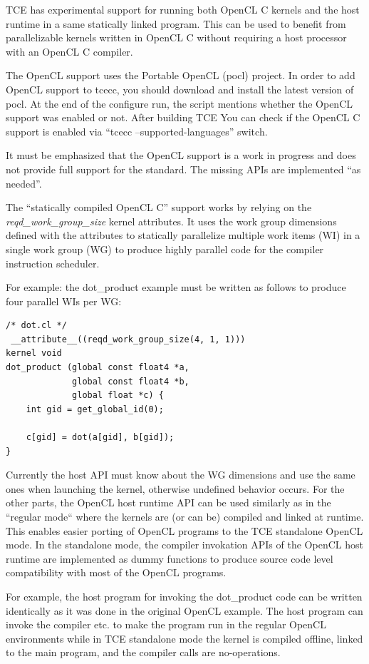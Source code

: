 \documentclass[twoside]{tceusermanual}
\begin{document}
TCE has experimental support for running both OpenCL C kernels and the host 
runtime in a same statically linked program. This can be used to benefit from
parallelizable kernels written in OpenCL C without requiring a host processor 
with an OpenCL C compiler.

The OpenCL support uses the {Portable OpenCL (pocl)} project. In order to
add OpenCL support to tcecc, you should download and install the latest version of 
pocl. At the end of the configure run, the script 
mentions whether the OpenCL support was enabled or not. After building TCE
You can check if the OpenCL C support is enabled via ``tcecc --supported-languages''
switch.

It must be emphasized that the OpenCL support is a work in progress and
does not provide full support for the standard. The missing APIs are
implemented ``as needed''.

The ``statically compiled OpenCL C'' support works by relying on the
\textit{reqd\_work\_group\_size} kernel attributes. It uses the work
group dimensions defined with the attributes to statically parallelize 
multiple work items (WI) in a single work group (WG) to produce highly 
parallel code for the compiler instruction scheduler.

For example: the dot\_product example must be written as follows to
produce four parallel WIs per WG:

\begin{verbatim}
/* dot.cl */
 __attribute__((reqd_work_group_size(4, 1, 1)))
kernel void
dot_product (global const float4 *a,
             global const float4 *b, 
             global float *c) {
    int gid = get_global_id(0);

    c[gid] = dot(a[gid], b[gid]);    
} 
\end{verbatim}

Currently the host API must know about the WG dimensions and use the
same ones when launching the kernel, otherwise undefined behavior
occurs. For the other parts, the OpenCL host runtime API can be used 
similarly as in the ``regular mode`` where the kernels are (or can be)
compiled and linked at runtime. This enables easier porting 
of OpenCL programs to the TCE standalone OpenCL mode. In the
standalone mode, the compiler invokation APIs of the OpenCL host runtime 
are implemented as dummy functions to produce source code level 
compatibility with most of the OpenCL programs.

For example, the host program for invoking the dot\_product code
can be written identically as it was done in the original OpenCL
example. The host program can invoke the compiler etc. to make
the program run in the regular OpenCL environments while in TCE
standalone mode the kernel is compiled offline, linked to the
main program, and the compiler calls are no-operations.
\end{document}
